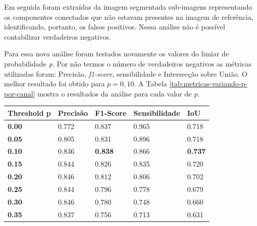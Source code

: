 Em seguida foram extraídas da imagem segmentada sub-imagens representando os componentes conectados que não estavam presentes na imagem de referência, identificando, portanto, os falsos positivos. Nessa análise não é possível contabilizar verdadeiros negativos. 


Para essa nova análise foram testados novamente os valores do limiar de probabilidade \textit{p}. Por não termos o número de verdadeiros negativos as métricas utilizadas foram: Precisão, \textit{f1-score}, sensibilidade e Intersecção sobre União. O melhor resultado foi obtido para \(p = 0,10\). A Tabela \ref{tab:metricas-variando-p-por-canal} mostra o resultados da análise para cada valor de \textit{p}.

\begin{table}[h]
\center
\begin{tiny}
\begin{tabular}{|l|l|l|l|l|}
\hline
\rowcolor[HTML]{C0C0C0} 
\textbf{Threshold p}                    &  \textbf{Precisão}   & \textbf{F1-Score}         & \textbf{Sensibilidade}   & \textbf{IoU}     \\ \hline
\cellcolor[HTML]{EFEFEF}\textbf{0.00}   &  0.772               & 0.837                     & 0.965                    & 0.718            \\ \cline{1-5}
\cellcolor[HTML]{EFEFEF}\textbf{0.05}   &  0.805               & 0.831                     & 0.896                    & 0.718            \\ \cline{1-5}
\rowcolor[HTML]{D0D0D0} \textbf{0.10}   &  0.836               & \textbf{0.838}            & 0.866                    & \textbf{0.737}            \\ \cline{1-5}
\cellcolor[HTML]{EFEFEF}\textbf{0.15}   &  0.844               & 0.826                     & 0.835                    & 0.720            \\ \cline{1-5} 
\cellcolor[HTML]{EFEFEF}\textbf{0.20}   &  0.846               & 0.812                     & 0.806                    & 0.702            \\ \cline{1-5}
\cellcolor[HTML]{EFEFEF}\textbf{0.25}   &  0.844               & 0.796                     & 0.778                    & 0.679            \\ \cline{1-5}
\cellcolor[HTML]{EFEFEF}\textbf{0.30}   &  0.846               & 0.780                     & 0.748                    & 0.660            \\ \cline{1-5}
\cellcolor[HTML]{EFEFEF}\textbf{0.35}   &  0.837               & 0.756                     & 0.713                    & 0.631            \\ \cline{1-5} 

\end{tabular}
\end{tiny}
\end{table}
